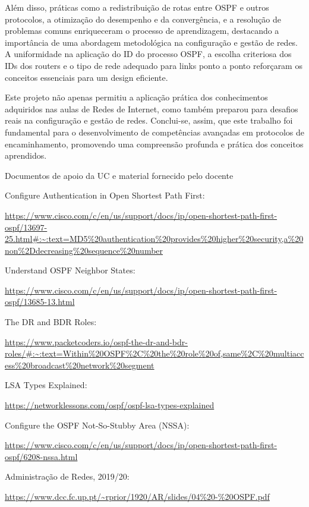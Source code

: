 \documentclass[11pt,english, openright, oneside]{book}
\begin{document}
\par Além disso, práticas como a redistribuição de rotas entre OSPF e outros protocolos, a otimização do desempenho e da convergência, e a resolução de problemas comuns enriqueceram o processo de aprendizagem, destacando a importância de uma abordagem metodológica na configuração e gestão de redes. A uniformidade na aplicação do ID do processo OSPF, a escolha criteriosa dos IDs dos routers e o tipo de rede adequado para links ponto a ponto reforçaram os conceitos essenciais para um design eficiente.

\par Este projeto não apenas permitiu a aplicação prática dos conhecimentos adquiridos nas aulas de Redes de Internet, como também preparou para desafios reais na configuração e gestão de redes. Conclui-se, assim, que este trabalho foi fundamental para o desenvolvimento de competências avançadas em protocolos de encaminhamento, promovendo uma compreensão profunda e prática dos conceitos aprendidos.
\pagebreak

\begin{thebibliography}{4} %
   Documentos de apoio da UC e material fornecido pelo docente

   Configure Authentication in Open Shortest Path First:\par 
  \url{https://www.cisco.com/c/en/us/support/docs/ip/open-shortest-path-first-ospf/13697-25.html#:~:text=MD5%20authentication%20provides%20higher%20security,a%20non%2Ddecreasing%20sequence%20number}

   Understand OSPF Neighbor States:\par 
  \url{https://www.cisco.com/c/en/us/support/docs/ip/open-shortest-path-first-ospf/13685-13.html}

   The DR and BDR Roles:\par 
  \url{https://www.packetcoders.io/ospf-the-dr-and-bdr-roles/#:~:text=Within%20OSPF%2C%20the%20role%20of,same%2C%20multiaccess%20broadcast%20network%20segment}

   LSA Types Explained:\par 
  \url{https://networklessons.com/ospf/ospf-lsa-types-explained}

   Configure the OSPF Not-So-Stubby Area (NSSA):\par 
  \url{https://www.cisco.com/c/en/us/support/docs/ip/open-shortest-path-first-ospf/6208-nssa.html}
    
   Administração
  de Redes,  2019/20: \par
  \url{https://www.dcc.fc.up.pt/~rprior/1920/AR/slides/04%20-%20OSPF.pdf}
\end{thebibliography}

\mainmatter
\end{document}
